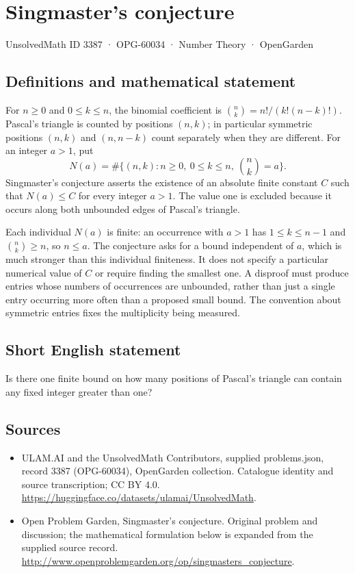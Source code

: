 \documentclass[11pt,a4paper]{article}
\begin{document}
\section*{Singmaster's conjecture}\label{3387}
{\small UnsolvedMath ID 3387 · OPG-60034 · Number Theory · OpenGarden}
\subsection{Definitions and mathematical statement}
For $n\ge0$ and $0\le k\le n$, the binomial coefficient is
$\binom nk=n!/(k!(n-k)!)$. Pascal's triangle is counted by positions
$(n,k)$; in particular symmetric positions $(n,k)$ and $(n,n-k)$
count separately when they are different. For an integer $a>1$, put
\[
 N(a)=\#\{(n,k):n\ge0,\ 0\le k\le n,\ \binom nk=a\}.
\]
Singmaster's conjecture asserts the existence of an absolute finite
constant $C$ such that $N(a)\le C$ for every integer $a>1$.
The value one is excluded because it occurs along both unbounded
edges of Pascal's triangle.

Each individual $N(a)$ is finite: an occurrence with $a>1$ has
$1\le k\le n-1$ and $\binom nk\ge n$, so $n\le a$.
The conjecture asks for a bound independent of $a$, which is much
stronger than this individual finiteness. It does not specify a
particular numerical value of $C$ or require finding the smallest
one. A disproof must produce entries whose numbers of occurrences
are unbounded, rather than just a single entry occurring more often
than a proposed small bound. The convention about symmetric entries
fixes the multiplicity being measured.
\subsection{Short English statement}
Is there one finite bound on how many positions of Pascal’s triangle can contain any fixed integer greater than one?
\subsection{Sources}
\begin{itemize}
\item[S1] ULAM.AI and the UnsolvedMath Contributors, supplied problems.json, record 3387 (OPG-60034), OpenGarden collection. Catalogue identity and source transcription; CC BY 4.0.
\url{https://huggingface.co/datasets/ulamai/UnsolvedMath}.
\item[S2] Open Problem Garden, Singmaster's conjecture. Original problem and discussion; the mathematical formulation below is expanded from the supplied source record.
\url{http://www.openproblemgarden.org/op/singmasters_conjecture}.
\end{itemize}
\end{document}
